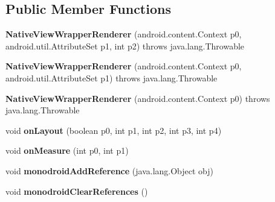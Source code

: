 \subsection*{Public Member Functions}
\begin{DoxyCompactItemize}
\item 
\mbox{\label{classmd5b60ffeb829f638581ab2bb9b1a7f4f3f_1_1NativeViewWrapperRenderer_a6b9d648e0b1da0d659615ff7f77d7448}} 
{\bfseries Native\+View\+Wrapper\+Renderer} (android.\+content.\+Context p0, android.\+util.\+Attribute\+Set p1, int p2)  throws java.\+lang.\+Throwable 	
\item 
\mbox{\label{classmd5b60ffeb829f638581ab2bb9b1a7f4f3f_1_1NativeViewWrapperRenderer_a7420e67b434dbf414eb77a0095b2e091}} 
{\bfseries Native\+View\+Wrapper\+Renderer} (android.\+content.\+Context p0, android.\+util.\+Attribute\+Set p1)  throws java.\+lang.\+Throwable 	
\item 
\mbox{\label{classmd5b60ffeb829f638581ab2bb9b1a7f4f3f_1_1NativeViewWrapperRenderer_ae139b1499b806b364389719fdac62705}} 
{\bfseries Native\+View\+Wrapper\+Renderer} (android.\+content.\+Context p0)  throws java.\+lang.\+Throwable 	
\item 
\mbox{\label{classmd5b60ffeb829f638581ab2bb9b1a7f4f3f_1_1NativeViewWrapperRenderer_a428463947529e7fd1d164b52f9d54d56}} 
void {\bfseries on\+Layout} (boolean p0, int p1, int p2, int p3, int p4)
\item 
\mbox{\label{classmd5b60ffeb829f638581ab2bb9b1a7f4f3f_1_1NativeViewWrapperRenderer_a83a4564a9f543507b77196fd2c440f12}} 
void {\bfseries on\+Measure} (int p0, int p1)
\item 
\mbox{\label{classmd5b60ffeb829f638581ab2bb9b1a7f4f3f_1_1NativeViewWrapperRenderer_ac0772b6e92a3ac384e0afcad6f2b8f3a}} 
void {\bfseries monodroid\+Add\+Reference} (java.\+lang.\+Object obj)
\item 
\mbox{\label{classmd5b60ffeb829f638581ab2bb9b1a7f4f3f_1_1NativeViewWrapperRenderer_a114bc48169194b48313389e210786635}} 
void {\bfseries monodroid\+Clear\+References} ()
\end{DoxyCompactItemize}
